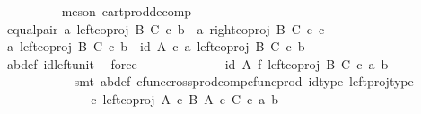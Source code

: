 \begin{isabellebody}
\ \ \ \ \ \ \ \ \isamarkupfalse%
\ {\isacharparenleft}{\kern0pt}meson\ cart{\isacharunderscore}{\kern0pt}prod{\isacharunderscore}{\kern0pt}decomp{\isacharparenright}{\kern0pt}\isanewline
\ \ \ \ \ \ \isamarkupfalse%
\ equal{\isacharunderscore}{\kern0pt}pair{\isacharcolon}{\kern0pt}\ {\isachardoublequoteopen}{\isasymlangle}a{\isacharcomma}{\kern0pt}\ {\isacharparenleft}{\kern0pt}left{\isacharunderscore}{\kern0pt}coproj\ B\ C{\isacharparenright}{\kern0pt}\ {\isasymcirc}\isactrlsub c\ b{\isasymrangle}\ {\isacharequal}{\kern0pt}\ {\isasymlangle}a{\isacharprime}{\kern0pt}{\isacharcomma}{\kern0pt}\ right{\isacharunderscore}{\kern0pt}coproj\ B\ C\ {\isasymcirc}\isactrlsub c\ c{\isacharprime}{\kern0pt}{\isasymrangle}{\isachardoublequoteclose}\isanewline
\ \ \ \ \ \ \isamarkupfalse%
\ {\isacharminus}{\kern0pt}\ \isanewline
\ \ \ \ \ \ \ \ \isamarkupfalse%
\ {\isachardoublequoteopen}{\isasymlangle}a{\isacharcomma}{\kern0pt}\ left{\isacharunderscore}{\kern0pt}coproj\ B\ C\ {\isasymcirc}\isactrlsub c\ b{\isasymrangle}\ {\isacharequal}{\kern0pt}\ {\isasymlangle}id\ A\ {\isasymcirc}\isactrlsub c\ a{\isacharcomma}{\kern0pt}\ left{\isacharunderscore}{\kern0pt}coproj\ B\ C\ {\isasymcirc}\isactrlsub c\ b{\isasymrangle}{\isachardoublequoteclose}\isanewline
\ \ \ \ \ \ \ \ \ \ \isamarkupfalse%
\ ab{\isacharunderscore}{\kern0pt}def\ id{\isacharunderscore}{\kern0pt}left{\isacharunderscore}{\kern0pt}unit{}\ \isamarkupfalse%
\ force\isanewline
\ \ \ \ \ \ \ \ \isamarkupfalse%
\ \isamarkupfalse%
\ {\isachardoublequoteopen}{\isachardot}{\kern0pt}{\isachardot}{\kern0pt}{\isachardot}{\kern0pt}\ {\isacharequal}{\kern0pt}\ {\isacharparenleft}{\kern0pt}id\ A\ {\isasymtimes}\isactrlsub f\ left{\isacharunderscore}{\kern0pt}coproj\ B\ C{\isacharparenright}{\kern0pt}\ {\isasymcirc}\isactrlsub c\ {\isasymlangle}a{\isacharcomma}{\kern0pt}\ b{\isasymrangle}{\isachardoublequoteclose}\isanewline
\ \ \ \ \ \ \ \ \ \ \isamarkupfalse%
\ {\isacharparenleft}{\kern0pt}smt\ ab{\isacharunderscore}{\kern0pt}def\ cfunc{\isacharunderscore}{\kern0pt}cross{\isacharunderscore}{\kern0pt}prod{\isacharunderscore}{\kern0pt}comp{\isacharunderscore}{\kern0pt}cfunc{\isacharunderscore}{\kern0pt}prod\ id{\isacharunderscore}{\kern0pt}type\ left{\isacharunderscore}{\kern0pt}proj{\isacharunderscore}{\kern0pt}type{\isacharparenright}{\kern0pt}\isanewline
\ \ \ \ \ \ \ \ \isamarkupfalse%
\ \isamarkupfalse%
\ {\isachardoublequoteopen}{\isachardot}{\kern0pt}{\isachardot}{\kern0pt}{\isachardot}{\kern0pt}\ {\isacharequal}{\kern0pt}\ {\isacharparenleft}{\kern0pt}{\isasymphi}\ {\isasymcirc}\isactrlsub c\ left{\isacharunderscore}{\kern0pt}coproj\ {\isacharparenleft}{\kern0pt}A\ {\isasymtimes}\isactrlsub c\ B{\isacharparenright}{\kern0pt}\ {\isacharparenleft}{\kern0pt}A\ {\isasymtimes}\isactrlsub c\ C{\isacharparenright}{\kern0pt}{\isacharparenright}{\kern0pt}\ {\isasymcirc}\isactrlsub c\ {\isasymlangle}a{\isacharcomma}{\kern0pt}\ b{\isasymrangle}{\isachardoublequoteclose}\isanewline

\end{isabellebody}

